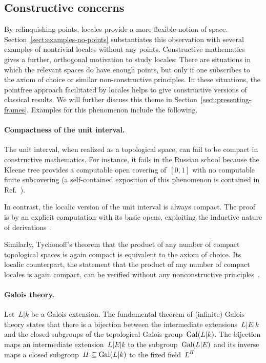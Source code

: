 \documentclass{ws-rv9x6}
\begin{document}
{\subsection{Constructive concerns}

By relinquishing points, locales provide a more flexible notion of space.
Section~\ref{sect:examples-no-points} substantiates this observation
with several examples of nontrivial locales without any points. Constructive
mathematics gives a further, orthogonal motivation to study locales: There are
situations in which the relevant spaces do have enough points, but only if one
subscribes to the axiom of choice or similar non-constructive principles. In
these situations, the pointfree approach facilitated by locales helps to give
constructive versions of classical results. We will further discuss this theme
in Section~\ref{sect:presenting-frames}. Examples for this phenomenon include
the following.

\paragraph{Compactness of the unit interval.} The unit interval, when realized
as a topological space, can fail to be compact in constructive
mathematics. For instance, it fails in the Russian school because the Kleene
tree provides a computable open covering of~$[0,1]$ with no computable finite
subcovering (a self-contained exposition of this phenomenon is contained in
Ref.~).

In contrast, the localic version of the unit interval is always compact. The
proof is by an explicit computation with its basic opens, exploiting the inductive
nature of derivations~\cite{cederquist-negri:heine-borel}.

Similarly, Tychonoff's theorem that the product of any number of compact
topological spaces is again compact is equivalent to the axiom of choice. Its
localic counterpart, the statement that the product of any number of compact
locales is again compact, can be verified without any nonconstructive
principles~\cite{vickers:tychonoff}.

\paragraph{Galois theory.} Let~$L|k$ be a Galois extension. The
fundamental theorem of (infinite) Galois theory states that there is a bijection between
the intermediate extensions~$L|E|k$ and the closed subgroups of the topological
Galois group~$\mathrm{Gal}(L|k)$. The bijection maps an intermediate extension~$L|E|k$
to the subgroup~$\mathrm{Gal}(L|E)$ and its inverse maps a closed subgroup~$H \subseteq
\mathrm{Gal}(L|k)$ to the fixed field~$L^H$.

}
\end{document}
